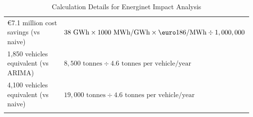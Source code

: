 \begin{xltabular}{\textwidth}{lX}
    \euro7.1 million cost savings (vs naive)         & \(38 \text{ GWh} \times 1000 \text{ MWh/GWh} \times \text{\euro}186/\text{MWh} \div 1,000,000\)                                                                                  \\
    1,850 vehicles equivalent (vs ARIMA)         & \(8,500 \text{ tonnes} \div 4.6 \text{ tonnes per vehicle/year}\)                                                                                                            \\
    4,100 vehicles equivalent (vs naive)         & \(19,000 \text{ tonnes} \div 4.6 \text{ tonnes per vehicle/year}\)                                                                                                           \\

    \hline
    \caption{Calculation Details for Energinet Impact Analysis}
    \label{tab:energinet-impact-calculations}
\end{xltabular}

\clearpage
